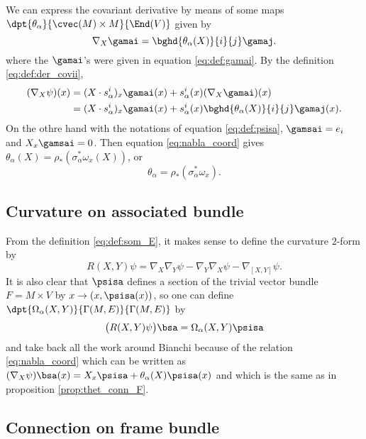 We can express the covariant derivative by means of some maps $\dpt{\theta_{\alpha}}{\cvec(M)\times M}{\End(V)}$ given by
 \begin{equation}
\nabla_X\gamai=\bghd{\theta_{\alpha}(X)}{i}{j}\gamaj.
 \end{equation}
where the $\gamai$'s were given in equation \eqref{eq:def:gamai}. By the definition \eqref{eq:def:der_covii},
\[
\begin{split}
  (\nabla_X\psi)(x)&=(X\cdot s^i_{\alpha})_x\gamai(x)+s^i_{\alpha}(x)(\nabla_X\gamai)(x)\\
                   &=(X\cdot s^i_{\alpha})_x\gamai(x)+s^i_{\alpha}(x)\bghd{\theta_{\alpha}(X)}{i}{j}\gamaj(x).
\end{split}
\]
On the othre hand with the notations of equation \eqref{eq:def:psisa}, $\gamsai=e_i$ and $X_x\gamsai=0$. Then equation \eqref{eq:nabla_coord} gives $\theta_{\alpha}(X)=\rho_*(\sigma_{\alpha}^*\omega_x(X))$, or
\begin{equation}
\theta_{\alpha}=\rho_*(\sigma^*_{\alpha}\omega_x).
\end{equation}

\subsection{Curvature on associated bundle}

From the definition \eqref{eq:def:som_E}, it makes sense to define the curvature $2$-form by
\[
  R(X,Y)\psi=\nabla_X\nabla_Y\psi-\nabla_Y\nabla_X\psi-\nabla_{[X,Y]}\psi.
\]
It is also clear that $\psisa$ defines a section of the trivial vector bundle $F=M\times V$ by $x\to (x,\psisa(x))$, so one can define  $\dpt{\Omega_{\alpha}(X,Y)}{\Gamma(M,E)}{\Gamma(M,E)}$ by
\[
  \big(  R(X,Y)\psi  \big)\bsa=\Omega_{\alpha}(X,Y)\psisa
\]
and take back all the work around Bianchi because of the relation \eqref{eq:nabla_coord} which can be written as $(\nabla_X\psi)\bsa(x)=X_x\psisa+\theta_{\alpha}(X)\psisa(x)$ and which is the same as in proposition \ref{prop:thet_conn_F}.

\subsection{Connection on frame bundle}

